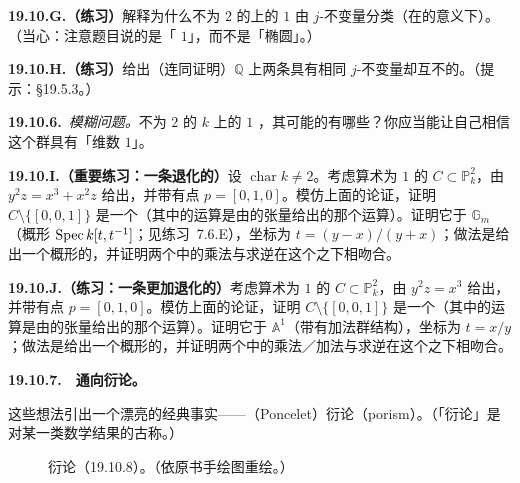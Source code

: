 \textbf{19.10.G.（练习）}\quad 解释为什么\trCharacteristic{}不为 $2$ 的\trAlgClosedField{}上的\trGenus{} $1$ \trCurve{}由 $j$-不变量分类（在\trIsomorphism{}的意义下）。（当心：注意题目说的是「\trGenus{} $1$」，而不是「椭圆」。）

\textbf{19.10.H.（练习）}\quad 给出（连同证明）$\mathbb{Q}$ 上两条具有相同 $j$-不变量却互不\trIsomorphic{}的\trEllipticCurve。（提示：\S19.5.3。）

\textbf{19.10.6.}\ \emph{模糊问题。}\quad \trCharacteristic{}不为 $2$ 的\trAlgClosedField{} $k$ 上的\trGenus{} $1$ \trCurve，其可能的\trAutomorphismGroup{}有哪些？你应当能让自己相信这个群具有「维数 $1$」。

\textbf{19.10.I.（重要练习：一条退化的\trEllipticCurve）}\quad 设 $\operatorname{char}k\ne 2$。考虑算术\trGenus{}为 $1$ 的\trCurve{} $C\subset\mathbb{P}^2_k$，由 $y^2z=x^3+x^2z$ 给出，并带有点 $p=[0,1,0]$。模仿上面的论证，证明 $C\setminus\{[0,0,1]\}$ 是一个\trGroupVariety（其中的运算是由\trLineBundle{}的张量给出的那个运算）。证明它\trIsomorphic{}于 $\mathbb{G}_m$（\trMultiplicativeGroup{}概形 $\operatorname{Spec} k[t,t^{-1}]$；见\mbox{练习~7.6.E}），坐标为 $t=(y-x)/(y+x)$；做法是给出一个概形的\trIsomorphism，并证明两个\trGroupVariety{}中的乘法与求逆在这个\trIsomorphism{}之下相吻合。

\textbf{19.10.J.（练习：一条更加退化的\trEllipticCurve）}\quad 考虑算术\trGenus{}为 $1$ 的\trCurve{} $C\subset\mathbb{P}^2_k$，由 $y^2z=x^3$ 给出，并带有点 $p=[0,1,0]$。模仿上面的论证，证明 $C\setminus\{[0,0,1]\}$ 是一个\trGroupVariety（其中的运算是由\trLineBundle{}的张量给出的那个运算）。证明它\trIsomorphic{}于 $\mathbb{A}^1$（带有加法群结构），坐标为 $t=x/y$；做法是给出一个概形的\trIsomorphism，并证明两个\trGroupVariety{}中的乘法／加法与求逆在这个\trIsomorphism{}之下相吻合。

\textbf{19.10.7.}\ \hard\ \textbf{通向\trPoncelet{}衍论。}

这些想法引出一个漂亮的经典事实——\trPoncelet{}（Poncelet）衍论（porism）。（「衍论」是对某一类数学结果的古称。）

\begin{figure}[htbp]
\centering
{}
\caption{\trPoncelet{}衍论（\mbox{19.10.8}）。（依原书手绘图重绘。）}\label{fig:poncelet-porism}
\end{figure}


